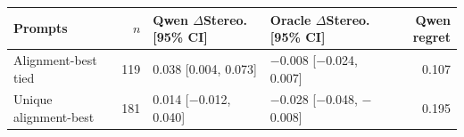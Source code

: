 

\footnotesize
\begin{tabular*}{\textwidth}{@{\extracolsep{\fill}}lrllr}
\toprule
Prompts & $n$ & Qwen $\Delta$Stereo. [95\% CI] & Oracle $\Delta$Stereo. [95\% CI] & Qwen regret\\
\midrule
Alignment-best tied & 119 & 0.038 [0.004, 0.073] & $-$0.008 [$-$0.024, 0.007] & 0.107\\
Unique alignment-best & 181 & 0.014 [$-$0.012, 0.040] & $-$0.028 [$-$0.048, $-$0.008] & 0.195\\
\bottomrule
\end{tabular*}

